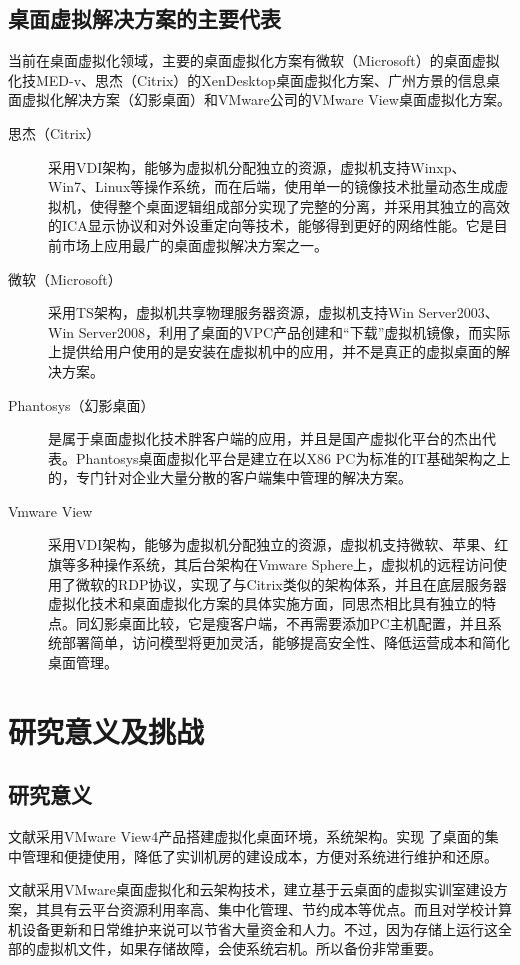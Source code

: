 \documentclass[10pt,a4paper]{article}
\begin{document}
\begin{CJK*}{UTF8}{gkai}
\subsection{桌面虚拟解决方案的主要代表}
当前在桌面虚拟化领域，主要的桌面虚拟化方案有微软（Microsoft）的桌面虚拟化技MED-v、思杰（Citrix）的XenDesktop桌面虚拟化方案、广州方景的信息桌面虚拟化解决方案（幻影桌面）和VMware公司的VMware View桌面虚拟化方案\cite{6}。
\begin{description}
\item[思杰（Citrix）]	采用VDI架构，能够为虚拟机分配独立的资源，虚拟机支持Winxp、Win7、Linux等操作系统，而在后端，使用单一的镜像技术批量动态生成虚拟机，使得整个桌面逻辑组成部分实现了完整的分离，并采用其独立的高效的ICA显示协议和对外设重定向等技术，能够得到更好的网络性能。它是目前市场上应用最广的桌面虚拟解决方案之一。
\item[微软（Microsoft）]	采用TS架构，虚拟机共享物理服务器资源，虚拟机支持Win Server2003、Win Server2008，利用了桌面的VPC产品创建和“下载”虚拟机镜像，而实际上提供给用户使用的是安装在虚拟机中的应用，并不是真正的虚拟桌面的解决方案。
\item[Phantosys（幻影桌面）]	是属于桌面虚拟化技术胖客户端的应用，并且是国产虚拟化平台的杰出代表。Phantosys桌面虚拟化平台是建立在以X86 PC为标准的IT基础架构之上的，专门针对企业大量分散的客户端集中管理的解决方案。
\item[Vmware View]	采用VDI架构，能够为虚拟机分配独立的资源，虚拟机支持微软、苹果、红旗等多种操作系统，其后台架构在Vmware Sphere上，虚拟机的远程访问使用了微软的RDP协议，实现了与Citrix类似的架构体系，并且在底层服务器虚拟化技术和桌面虚拟化方案的具体实施方面，同思杰相比具有独立的特点。同幻影桌面比较，它是瘦客户端，不再需要添加PC主机配置，并且系统部署简单，访问模型将更加灵活，能够提高安全性、降低运营成本和简化桌面管理。
\end{description}


\section{研究意义及挑战}
\subsection{研究意义}
文献\cite{5}采用VMware View4产品搭建虚拟化桌面环境，系统架构。实现 了桌面的集中管理和便捷使用，降低了实训机房的建设成本，方便对系统进行维护和还原。


文献\cite{7}采用VMware桌面虚拟化和云架构技术，建立基于云桌面的虚拟实训室建设方案，其具有云平台资源利用率高、集中化管理、节约成本等优点。而且对学校计算机设备更新和日常维护来说可以节省大量资金和人力。不过，因为存储上运行这全部的虚拟机文件，如果存储故障，会使系统宕机。所以备份非常重要。



\end{CJK*}
\end{document}
